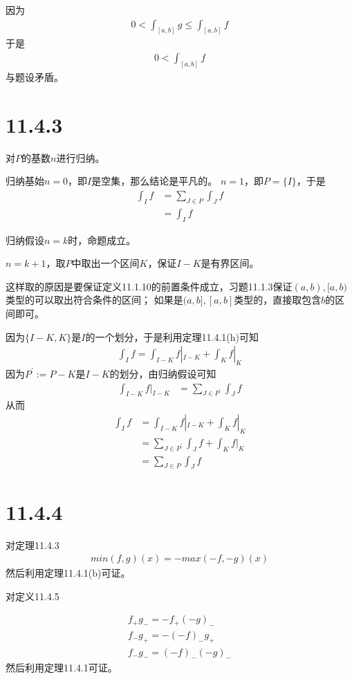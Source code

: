 \documentclass{article}
\begin{document}
因为
\begin{align*}
  0 < \int_{[a, b]} g \leq \int_{[a, b]} f
\end{align*}
于是
\begin{align*}
  0 < \int_{[a, b]} f
\end{align*}
与题设矛盾。

\section*{11.4.3}
对$P$的基数$n$进行归纳。

归纳基始$n=0$，即$I$是空集，那么结论是平凡的。
$n = 1$，即$P = \{I\}$，于是
\begin{align*}
  \int_I f & = \sum\limits_{J \in P} \int_J f \\
           & = \int_I f
\end{align*}

归纳假设$n = k$时，命题成立。

$n = k+1$，取$P$中取出一个区间$K$，保证$I - K$是有界区间。

\begin{zremark}
  这样取的原因是要保证定义11.1.10的前置条件成立，习题11.1.3保证$(a,b),[a,b)$类型的可以取出符合条件的区间；
  如果是$(a, b], [a, b]$类型的，直接取包含$b$的区间即可。
\end{zremark}

因为$\{I - K, K\}$是$I$的一个划分，于是利用定理11.4.1(h)可知
\begin{align*}
  \int_I f = \int_{I - K} f|_{I - K} + \int_K f|_K
\end{align*}
因为$P^\prime :=P - K$是$I - K$的划分，由归纳假设可知
\begin{align*}
  \int_{I - K} f|_{I - K} & = \sum\limits_{J \in P^\prime} \int_J f
\end{align*}
从而
\begin{align*}
  \int_I f & = \int_{I - K} f|_{I - K} + \int_K f|_K \\
           & = \sum\limits_{J \in P^\prime} \int_J f + \int_K f|_K \\
           & = \sum\limits_{J \in P} \int_J f
\end{align*}

\section*{11.4.4}

对定理11.4.3
\begin{align*}
  min(f, g)(x) = -max(-f, -g)(x)
\end{align*}
然后利用定理11.4.1(b)可证。

对定义11.4.5

\begin{align*}
  f_{+}g_{-} = -f_{+}(-g)_{-} \\
  f_{-}g_{+} = -(-f)_{-}g_{+} \\
  f_{-}g_{-} = (-f)_{-}(-g)_{-}
\end{align*}
然后利用定理11.4.1可证。
\end{document}
